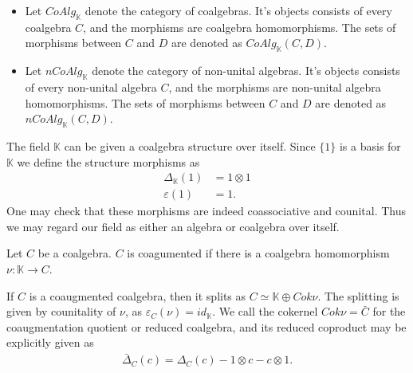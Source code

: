 \documentclass[../../thesis.tex]{subfiles}
\begin{document}
            \begin{definition}
                \begin{itemize}
                    \item Let $CoAlg_{\mathbb{K}}$ denote the category of coalgebras. It's objects consists of every coalgebra $C$, and the morphisms are coalgebra homomorphisms. The sets of morphisms between $C$ and $D$ are denoted as $CoAlg_{\mathbb{K}}(C,D)$.
                    \item Let $nCoAlg_{\mathbb{K}}$ denote the category of non-unital algebras. It's objects consists of every non-unital algebra $C$, and the morphisms are non-unital algebra homomorphisms. The sets of morphisms between $C$ and $D$ are denoted as $nCoAlg_{\mathbb{K}}(C,D)$.
                \end{itemize}
            \end{definition}

            \begin{example}
                The field $\mathbb{K}$ can be given a coalgebra structure over itself. Since $\{1\}$ is a basis for $\mathbb{K}$ we define the structure morphisms as
                \begin{align*}
                    \Delta_{\mathbb{K}}(1) & = 1\otimes 1 \\
                    \varepsilon(1) & = 1.
                \end{align*}
                One may check that these morphisms are indeed coassociative and counital. Thus we may regard our field as either an algebra or coalgebra over itself.
            \end{example}

            \begin{definition}
                Let $C$ be a coalgebra. $C$ is coagumented if there is a coalgebra homomorphism $\nu:\mathbb{K}\rightarrow C$.
            \end{definition}

            If $C$ is a coaugmented coalgebra, then it splits as $C\simeq \mathbb{K}\oplus Cok\nu$. The splitting is given by counitality of $\nu$, as $\varepsilon_C(\nu) = id_{\mathbb{K}}$. We call the cokernel $Cok\nu = \bar{C}$ for the coaugmentation quotient or reduced coalgebra, and its reduced coproduct may be explicitly given as
            \begin{align*}
                \bar{\Delta}_C(c) = \Delta_C(c) - 1\otimes c - c\otimes 1. 
            \end{align*}
\end{document}
